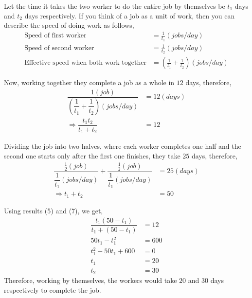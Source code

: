 \begin{solution}[\fullpage]
  Let the time it takes the two worker to do the entire job by themselves be $t_1$ days and $t_2$ days respectively. If you think of a job as a unit of work, then you can describe the speed of doing work as follows,
  \begin{align}
    \text{Speed of first worker}  &= \frac{1}{t_1}(jobs/day) \\
    \text{Speed of second worker} &= \frac{1}{t_2}(jobs/day) \\
    \text{Effective speed when both work together}     
    				  &= \left(\frac{1}{t_1}+\frac{1}{t_2}\right)(jobs/day)
  \end{align}
  
  Now, working together they complete a job as a whole in $12$ days, therefore,
  \begin{align}
	\dfrac{1(job)}
	      {\left(\dfrac{1}{t_1}+\dfrac{1}{t_2}\right)(jobs/day)} &= 12(days) \\
	\Rightarrow \dfrac{t_1t_2}{t_1+t_2}                          &= 12
  \end{align}
  
  Dividing the job into two halves, where each worker completes one half and the second one starts only after the first one finishes, they take $25$ days, therefore,
  \begin{align}
    \dfrac{\frac{1}{2}(job)}{\dfrac{1}{t_1}(jobs/day)}+
    	\dfrac{\frac{1}{2}(job)}{\dfrac{1}{t_1}(jobs/day)} &= 25(days) \\
    \Rightarrow t_1+t_2                                    &= 50
  \end{align}
  
  Using results (5) and (7), we get,
  \begin{align}
    \dfrac{t_1(50-t_1)}{t_1+(50-t_1)} &= 12 \\
    50t_1-t_1^2                       &= 600 \\
    t_1^2-50t_1+600                   &= 0 \\     
    t_1                               &= 20 \\
    t_2                               &= 30
  \end{align}
  Therefore, working by themselves, the workers would take $20$ and $30$ days respectively to complete the job.

\end{solution}

